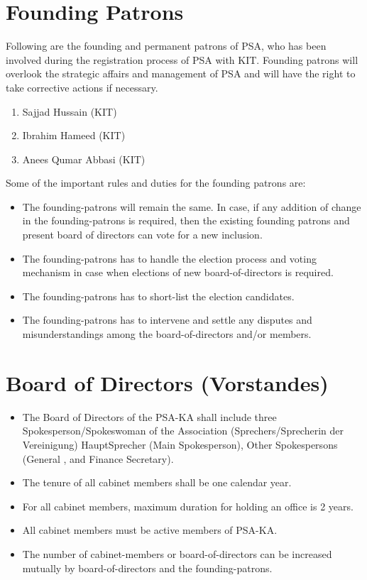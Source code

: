 \section{Founding Patrons  }
Following are the founding and permanent patrons of PSA, who has been involved during the registration process of PSA with KIT. Founding patrons will overlook the strategic affairs and management of PSA and will have the right to take corrective actions if necessary.
\begin{enumerate}
	\item Sajjad Hussain (KIT)
	\item Ibrahim Hameed (KIT)
	\item Anees Qumar Abbasi (KIT)
\end{enumerate}
Some of the important rules and duties for the founding patrons are:
\begin{itemize}
	\item The founding-patrons will remain the same. In case, if any addition of change in the founding-patrons is required, then the existing founding patrons and present board of directors can vote for a new inclusion.
	\item The founding-patrons has to handle the election process and voting mechanism in case when elections of new board-of-directors is required.
	\item The founding-patrons has to short-list the election candidates.
	\item The founding-patrons has to intervene and settle any disputes and misunderstandings among the board-of-directors and/or members.
\end{itemize}
\section{Board of Directors (Vorstandes)  }
\begin{itemize}
	\item The Board of Directors of the PSA-KA shall include three Spokesperson/Spokeswoman of the Association (Sprechers/Sprecherin der Vereinigung) HauptSprecher (Main Spokesperson), Other Spokespersons (General , and Finance Secretary). 
	\item The tenure of all cabinet members shall be one calendar year. 
	\item For all cabinet members, maximum duration for holding an office is 2 years. 
	\item All cabinet members must be active members of PSA-KA. 
	\item The number of cabinet-members or board-of-directors can be increased mutually by board-of-directors and the founding-patrons.
\end{itemize}
